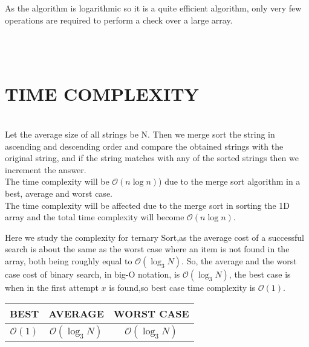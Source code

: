 \documentclass[conference]{IEEEtran}
\begin{document}
As the algorithm is logarithmic so it is a quite efficient algorithm, only very few operations are required to perform a check over a large array.

\\\\
\section{TIME COMPLEXITY}\\
Let the average size of all strings be N.
Then we merge sort the string in ascending and 
descending order and compare the obtained strings 
with the original string, and if the string matches 
with any of the sorted strings then we increment the 
answer.\\ 
The time complexity will be \begin{math} \mathcal{O}(n\log{}n)\end{math}) due to the 
merge sort algorithm in a best, average and worst 
case.\\ 
The time complexity will be affected due to the 
merge sort in sorting the 1D array and the total 
time complexity will become \begin{math} \mathcal{O}(n\log{}n)\end{math}.

Here we study the complexity for ternary Sort,as the average cost of a successful search is about the same as the worst case where an item is not found in the array, both being roughly equal to \begin{math} \mathcal{O}(\log_{3}N)\end{math}. So, the average and the worst case cost of binary search, in big-O notation, is \begin{math} \mathcal{O}(\log_{3}N)\end{math}, the best case is when in the first attempt $x$ is found,so best case time complexity is \begin{math} \mathcal{O}(1)\end{math}.

\begin{center}
 \begin{tabular}{||c c c||} 
 \hline
  BEST & AVERAGE & WORST CASE  \\  
 \hline\hline
 \begin{math} \mathcal{O}(1)\end{math} & \begin{math} \mathcal{O}(\log_{3}N)\end{math} & \begin{math} \mathcal{O}(\log_{3}N)\end{math} \\ 
 \hline
\end{tabular}
\end{center}
\end{document}
